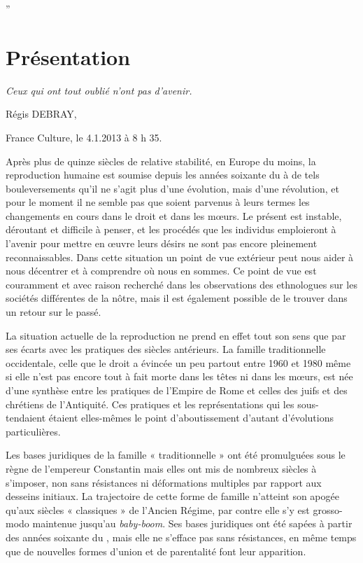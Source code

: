 

”\chapter{Présentation}

\emph{Ceux qui ont tout oublié n'ont pas d'avenir.}


Régis DEBRAY, 

France Culture, le 4.1.2013 à 8 h 35.







Après plus de quinze siècles de relative stabilité, en Europe du moins, la reproduction humaine
est soumise depuis les années soixante du  à de tels bouleversements
qu'il ne s'agit plus d'une évolution, mais d'une révolution, et pour le moment il
ne semble pas que soient  parvenus à leurs termes les changements en
cours dans le droit et dans les mœurs. Le présent est instable, déroutant et difficile à penser, et les procédés que les individus emploieront
à l'avenir pour mettre en œuvre leurs désirs ne sont pas
encore pleinement reconnaissables.
Dans cette situation un point de vue extérieur peut nous aider à nous décentrer et à
comprendre où nous en sommes. Ce point de vue est couramment et avec raison recherché dans les observations des ethnologues sur les sociétés différentes de la nôtre, mais il est également possible de le trouver dans un retour sur le passé.





La situation actuelle de la reproduction ne prend en effet tout son sens que par ses écarts avec les pratiques des siècles antérieurs.
La famille traditionnelle occidentale, celle que le droit a évincée un peu partout entre 1960 et
1980 même si elle n'est pas encore tout à fait morte dans les têtes ni dans les mœurs, est
née d'une synthèse entre les pratiques de l'Empire de Rome et celles des
juifs et des chrétiens de l'Antiquité. Ces pratiques et les représentations
qui les sous-tendaient étaient elles-mêmes le point d'aboutissement
d'autant d'évolutions particulières.

Les bases juridiques de la famille « traditionnelle » ont été promulguées sous le règne
de l'empereur Constantin mais elles ont mis de nombreux
siècles à s'imposer, non sans résistances ni déformations multiples par
rapport aux desseins initiaux. La trajectoire de cette forme de famille n'atteint son apogée qu'aux
siècles « classiques » de l'Ancien Régime, par contre elle s'y est grosso-modo maintenue jusqu'au
\emph{baby-boom}. Ses bases juridiques ont été sapées à partir des années soixante du , mais elle ne s'efface pas sans résistances, en même temps que de nouvelles formes d'union et de parentalité font leur apparition.

